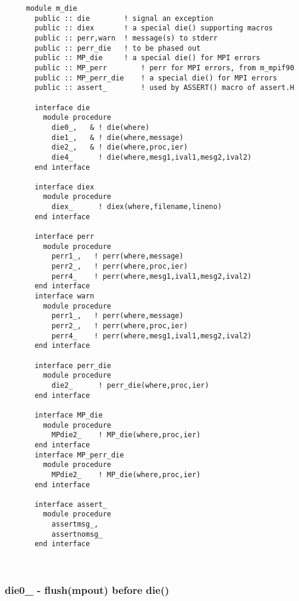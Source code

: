 \begin{verbatim} 
     module m_die
       public :: die		! signal an exception
       public :: diex		! a special die() supporting macros
       public :: perr,warn	! message(s) to stderr
       public :: perr_die	! to be phased out
       public :: MP_die		! a special die() for MPI errors
       public :: MP_perr		! perr for MPI errors, from m_mpif90
       public :: MP_perr_die	! a special die() for MPI errors
       public :: assert_		! used by ASSERT() macro of assert.H
 
       interface die
         module procedure
           die0_,	& ! die(where)
           die1_,	& ! die(where,message)
           die2_,	& ! die(where,proc,ier)
           die4_	  ! die(where,mesg1,ival1,mesg2,ival2)
       end interface
 
       interface diex
         module procedure
           diex_	  ! diex(where,filename,lineno)
       end interface
 
       interface perr
         module procedure
           perr1_,	 ! perr(where,message)
           perr2_,	 ! perr(where,proc,ier)
           perr4_	 ! perr(where,mesg1,ival1,mesg2,ival2)
       end interface
       interface warn
         module procedure	
           perr1_,	 ! perr(where,message)
           perr2_,	 ! perr(where,proc,ier)
           perr4_	 ! perr(where,mesg1,ival1,mesg2,ival2)
       end interface
 
       interface perr_die
         module procedure
           die2_	  ! perr_die(where,proc,ier)
       end interface
 
       interface MP_die
         module procedure
           MPdie2_	  ! MP_die(where,proc,ier)
       end interface
       interface MP_perr_die
         module procedure
           MPdie2_	  ! MP_die(where,proc,ier)
       end interface
 
       interface assert_
         module procedure
           assertmsg_,	
           assertnomsg_
       end interface
 \end{verbatim}%
 
 
\mbox{}\hrulefill\ 

  \subsubsection{die0\_ - flush(mpout) before die()}

